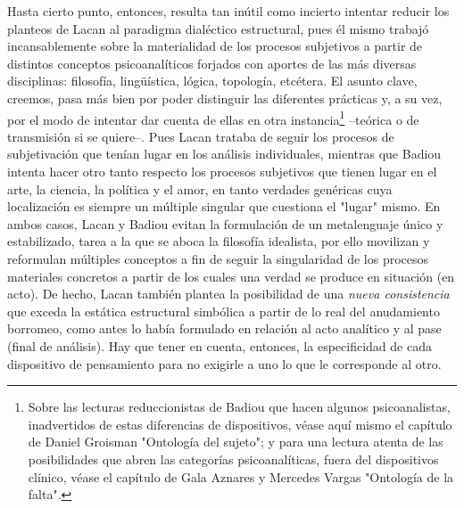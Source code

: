Hasta cierto punto, entonces, resulta tan inútil como incierto intentar
reducir los planteos de Lacan al paradigma dialéctico estructural, pues
él mismo trabajó incansablemente sobre la materialidad de los procesos
subjetivos a partir de distintos conceptos psicoanalíticos forjados con
aportes de las más diversas disciplinas: filosofía, lingüística, lógica,
topología, etcétera. El asunto clave, creemos, pasa más bien por poder
distinguir las diferentes prácticas y, a su vez, por el modo de intentar
dar cuenta de ellas en otra instancia\footnote{Sobre las lecturas
  reduccionistas de Badiou que hacen algunos psicoanalistas,
  inadvertidos de estas diferencias de dispositivos, véase aquí mismo el
  capítulo de Daniel Groisman "Ontología del sujeto"; y para una lectura
  atenta de las posibilidades que abren las categorías psicoanalíticas,
  fuera del dispositivos clínico, véase el capítulo de Gala Aznares y
  Mercedes Vargas "Ontología de la falta".} --teórica o de transmisión
si se quiere--. Pues Lacan trataba de seguir los procesos de
subjetivación que tenían lugar en los análisis individuales, mientras
que Badiou intenta hacer otro tanto respecto los procesos subjetivos que
tienen lugar en el arte, la ciencia, la política y el amor, en tanto
verdades genéricas cuya localización es siempre un múltiple singular que
cuestiona el "lugar" mismo. En ambos casos, Lacan y Badiou evitan la
formulación de un metalenguaje único y estabilizado, tarea a la que se
aboca la filosofía idealista, por ello movilizan y reformulan múltiples
conceptos a fin de seguir la singularidad de los procesos materiales
concretos a partir de los cuales una verdad se produce en situación (en
acto). De hecho, Lacan también plantea la posibilidad de una \emph{nueva
consistencia} que exceda la estática estructural simbólica a partir de
lo real del anudamiento borromeo, como antes lo había formulado en
relación al acto analítico y al pase (final de análisis). Hay que tener
en cuenta, entonces, la especificidad de cada dispositivo de pensamiento
para no exigirle a uno lo que le corresponde al otro.

